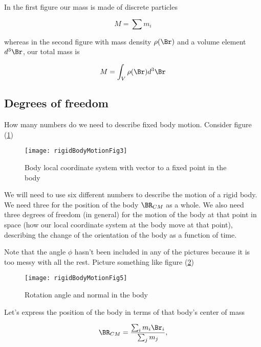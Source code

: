 In the first figure our mass is made of discrete particles

\begin{equation}\label{eqn:rigidBodyMotion:20}
M = \sum m_i
\end{equation}

whereas in the second figure with mass density $\rho(\Br)$ and a volume element $d^3\Br$, our total mass is

\begin{equation}\label{eqn:rigidBodyMotion:40}
M = \int_V \rho(\Br) d^3\Br
\end{equation}

\subsection{Degrees of freedom}

How many numbers do we need to describe fixed body motion.  Consider figure (\ref{fig:rigidBodyMotion:rigidBodyMotionFig3})
\begin{figure}[htp]
   \centering
   \texttt{[image: rigidBodyMotionFig3]}
   \caption{Body local coordinate system with vector to a fixed point in the body}\label{fig:rigidBodyMotion:rigidBodyMotionFig3}
\end{figure}

We will need to use six different numbers to describe the motion of a rigid body.  We need three for the position of the body $\BR_{CM}$ as a whole.  We also need three degrees of freedom (in general) for the motion of the body at that point in space (how our local coordinate system at the body move at that point), describing the change of the orientation of the body as a function of time.

Note that the angle $\phi$ hasn't been included in any of the pictures because it is too messy with all the rest.  Picture something like figure (\ref{fig:rigidBodyMotion:rigidBodyMotionFig5})
\begin{figure}[htp]
   \centering
   \texttt{[image: rigidBodyMotionFig5]}
   \caption{Rotation angle and normal in the body}\label{fig:rigidBodyMotion:rigidBodyMotionFig5}
\end{figure}

Let's express the position of the body in terms of that body's center of mass 

\begin{equation}\label{eqn:rigidBodyMotion:60}
\BR_{CM} = \frac{\sum_i m_i \Br_i}{\sum_j m_j},
\end{equation}


